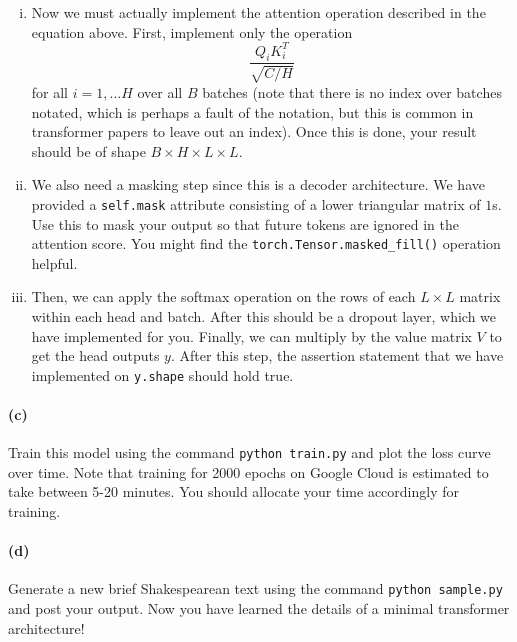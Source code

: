 \documentclass{exam}
\begin{document}
\begin{enumerate}[i.]
    \item Now we must actually implement the attention operation described in the equation above. First, implement only the operation 
    \begin{equation}
        \frac{Q_i K_i^T}{\sqrt{C/H}}
    \end{equation} 
    for all $i = 1, \ldots H$ over all $B$ batches (note that there is no index over batches notated, which is perhaps a fault of the notation, but this is common in transformer papers to leave out an index). Once this is done, your result should be of shape $B \times H \times L \times L$. 

    \item We also need a masking step since this is a decoder architecture. We have provided a \texttt{self.mask} attribute consisting of a lower triangular matrix of $1$s. Use this to mask your output so that future tokens are ignored in the attention score. You might find the \texttt{torch.Tensor.masked\_fill()} operation helpful. 

    \item Then, we can apply the softmax operation on the rows of each $L\times L$ matrix within each head and batch. After this should be a dropout layer, which we have implemented for you. Finally, we can multiply by the value matrix $V$ to get the head outputs $y$. After this step, the assertion statement that we have implemented on \texttt{y.shape} should hold true. 
\end{enumerate}


\paragraph{(c)} Train this model using the command \texttt{python train.py} and plot the loss curve over time. Note that training for 2000 epochs on Google Cloud is estimated to take between 5-20 minutes. You should allocate your time accordingly for training. 

\paragraph{(d)} Generate a new brief Shakespearean text using the command \texttt{python sample.py} and post your output. Now you have learned the details of a minimal transformer architecture! 
\end{document}
